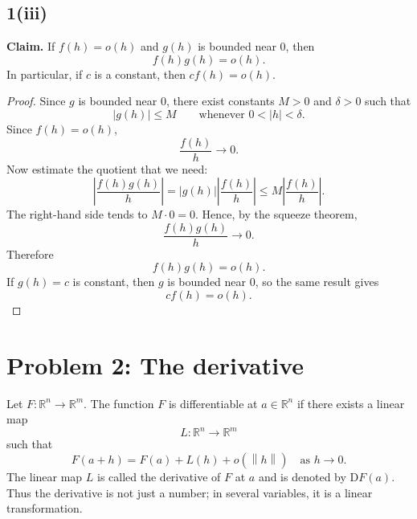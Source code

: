 \documentclass[11pt]{article}
\newcommand{\R}{\mathbb{R}}
\newcommand{\norm}[1]{\left\lVert #1\right\rVert}
\newcommand{\D}{\mathrm{D}}
\begin{document}
\subsection*{1(iii)}
\textbf{Claim.} If $f(h)=o(h)$ and $g(h)$ is bounded near $0$, then
\[
 f(h)g(h)=o(h).
\]
In particular, if $c$ is a constant, then $cf(h)=o(h)$.

\begin{proof}
Since $g$ is bounded near $0$, there exist constants $M>0$ and $\delta>0$ such that
\[
 |g(h)|\leq M\qquad\text{whenever }0<|h|<\delta.
\]
Since $f(h)=o(h)$,
\[
 \frac{f(h)}{h}\to 0.
\]
Now estimate the quotient that we need:
\[
 \left|\frac{f(h)g(h)}{h}\right|
 = |g(h)|\left|\frac{f(h)}{h}\right|
 \leq M\left|\frac{f(h)}{h}\right|.
\]
The right-hand side tends to $M\cdot 0=0$.  Hence, by the squeeze theorem,
\[
 \frac{f(h)g(h)}{h}\to 0.
\]
Therefore
\[
 \boxed{f(h)g(h)=o(h).}
\]
If $g(h)=c$ is constant, then $g$ is bounded near $0$, so the same result gives
\[
 \boxed{cf(h)=o(h).}
\]
\end{proof}

\newpage
\section{Problem 2: The derivative}

\begin{methodbox}
Let $F:\R^n\to\R^m$.  The function $F$ is differentiable at $a\in\R^n$ if there exists a linear map
\[
 L:\R^n\to\R^m
\]
such that
\[
 F(a+h)=F(a)+L(h)+o(\norm{h})\quad\text{as }h\to 0.
\]
The linear map $L$ is called the derivative of $F$ at $a$ and is denoted by $\D F(a)$.  Thus the derivative is not just a number; in several variables, it is a linear transformation.
\end{methodbox}

\begin{center}
\end{center}
\end{document}
